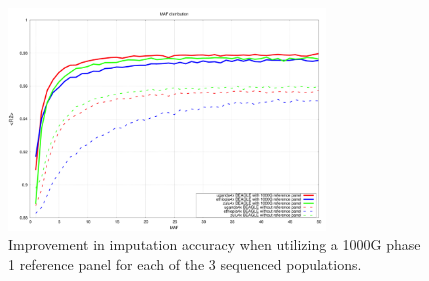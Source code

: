 \begin{figure}[htbp]
\centering
\includegraphics[width=0.75\textwidth]{fig/SN09f3}
\caption{Improvement in imputation accuracy when utilizing a 1000G phase 1 reference panel for each of the 3 sequenced populations.}
\label{fig:SN09f3}
\end{figure}